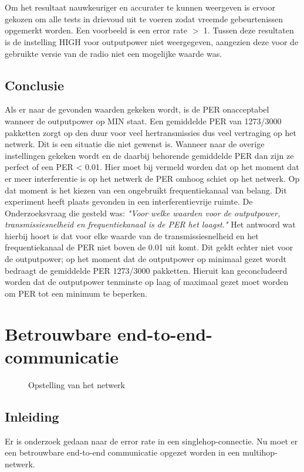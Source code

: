 \documentclass{article}
\begin{document}
\\
\\
Om het resultaat nauwkeuriger en accurater te kunnen weergeven is ervoor gekozen om alle tests in drievoud uit te voeren zodat vreemde gebeurtenissen opgemerkt worden. Een voorbeeld is een error rate $>$ 1. Tussen deze resultaten is de instelling HIGH voor outputpower niet weergegeven, aangezien deze voor de gebruikte versie van de radio niet een mogelijke waarde was.

\subsection{Conclusie}
Als er naar de gevonden waarden gekeken wordt, is de PER onacceptabel wanneer de outputpower op MIN staat. Een gemiddelde PER van 1273/3000 pakketten zorgt op den duur voor veel hertransmissies dus veel vertraging op het netwerk. Dit is een situatie die niet gewenst is. Wanneer naar de overige instellingen gekeken wordt en de daarbij behorende gemiddelde PER dan zijn ze perfect of een PER < 0.01. Hier moet bij vermeld worden dat op het moment dat er meer interferentie is op het netwerk de PER omhoog schiet op het netwerk. Op dat moment is het kiezen van een ongebruikt frequentiekanaal van belang. Dit experiment heeft plaats gevonden in een interferentievrije ruimte.
De Onderzoeksvraag die gesteld was: \textit{"Voor welke waarden voor de outputpower, transmissiesnelheid en frequentiekanaal is de PER het laagst."} Het antwoord wat hierbij hoort is dat voor elke waarde van de transmissiesnelheid en het frequentiekanaal de PER niet boven de 0.01 uit komt. Dit geldt echter niet voor de outputpower; op het moment dat de outputpower op minimaal gezet wordt bedraagt de gemiddelde PER 1273/3000 pakketten. Hieruit kan geconcludeerd worden dat de outputpower tenminste op laag of maximaal gezet moet worden om PER tot een minimum te beperken. 

\newpage

\clearpage
\section{Betrouwbare end-to-end-communicatie}
\begin{figure}
\centering 
{} 
\caption{Opstelling van het netwerk}
\label{fig:converter} %
\end{figure}

\subsection{Inleiding}
Er is onderzoek gedaan naar de error rate in een singlehop-connectie. Nu moet er een betrouwbare end-to-end communicatie opgezet worden in een multihop-netwerk. 
\end{document}
